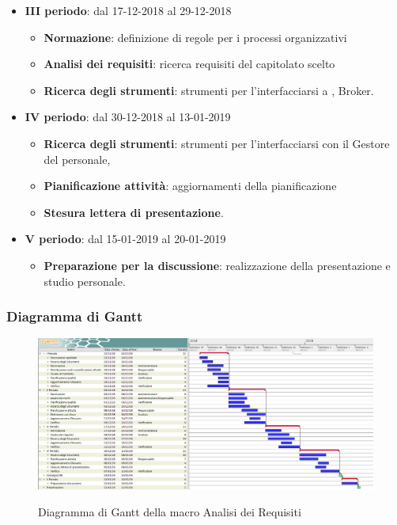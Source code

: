 \begin{itemize}
\begin{itemize}
        	\end{itemize}
        	\item \textbf{III periodo}: dal 17-12-2018 al 29-12-2018
			\begin{itemize}
    	        \item \textbf{Normazione}: definizione di regole per i processi organizzativi
    	        \item \textbf{Analisi dei requisiti}: ricerca requisiti del capitolato scelto
       	        \item \textbf{Ricerca degli strumenti}: strumenti per l'interfacciarsi a , Broker.
        	\end{itemize}
        	\item \textbf{IV periodo}: dal 30-12-2018 al 13-01-2019
        	\begin{itemize}
       	        \item \textbf{Ricerca degli strumenti}: strumenti per l'interfacciarsi con il Gestore del personale, 
       	        \item \textbf{Pianificazione attività}: aggiornamenti della pianificazione
       	        \item \textbf{Stesura lettera di presentazione}.
        	\end{itemize}
        	\item \textbf{V periodo}: dal 15-01-2019 al 20-01-2019
        	\begin{itemize}
    	        \item \textbf{Preparazione per la discussione}: realizzazione della presentazione e studio personale.
        	\end{itemize}
		\end{itemize}
		
        \begin{landscape}
			\subsubsection{Diagramma di Gantt}        
			\begin{figure}[H]
					\centering
					\includegraphics[scale=0.425]{img/Analisi_dei_requisiti.png}\\
					\caption{Diagramma di Gantt della macro Analisi dei Requisiti}
			\end{figure}
		\end{landscape}
	
